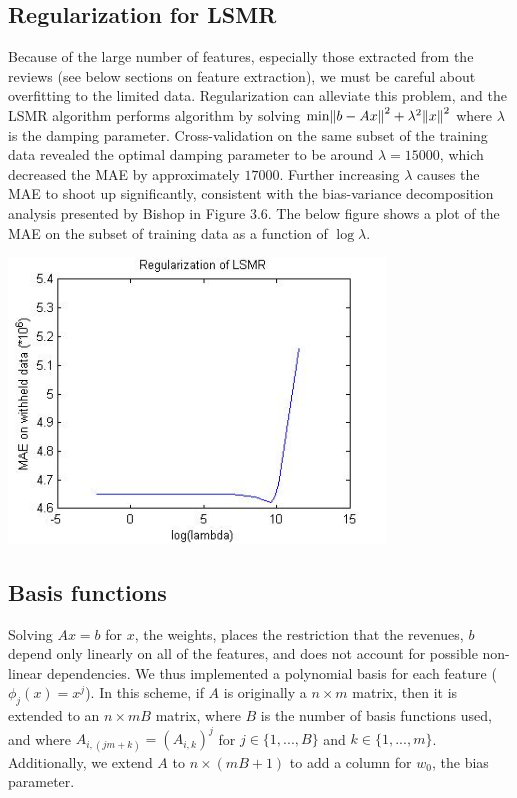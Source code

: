 \documentclass[11pt]{amsart}
\begin{document}
\subsection{Regularization for LSMR}
Because of the large number of features, especially those extracted from the reviews (see below sections on feature extraction), we must be careful about overfitting to the limited data. Regularization can alleviate this problem, and the LSMR algorithm performs algorithm by solving $\text{min}\norm{b-Ax}^2+\lambda^2\norm{x}^2$ where $\lambda$ is the damping parameter. Cross-validation on the same subset of the training data revealed the optimal damping parameter to be around $\lambda=15000$, which decreased the MAE by approximately $17000$. Further increasing $\lambda$ causes the MAE to shoot up significantly, consistent with the bias-variance decomposition analysis presented by Bishop in Figure 3.6. The below figure shows a plot of the MAE on the subset of training data as a function of $\log{\lambda}$.

\begin{center}
\includegraphics[width=10cm]{LSMR-Regularization.jpg}
\end{center}

\subsection{Basis functions}
Solving $Ax=b$ for $x$, the weights, places the restriction that the revenues, $b$ depend only linearly on all of the features, and does not account for possible non-linear dependencies. We thus implemented a polynomial basis for each feature ($\phi_j(x)=x^j$). In this scheme, if $A$ is originally a $n\times m$ matrix, then it is extended to an $n \times mB$ matrix, where $B$ is the number of basis functions used, and where $A_{i,(jm+k)}=(A_{i,k})^j$ for $j\in\{1,...,B\}$ and $k\in\{1,...,m\}$. Additionally, we extend $A$ to $n\times (mB+1)$ to add a column for $w_0$, the bias parameter.
\end{document}
